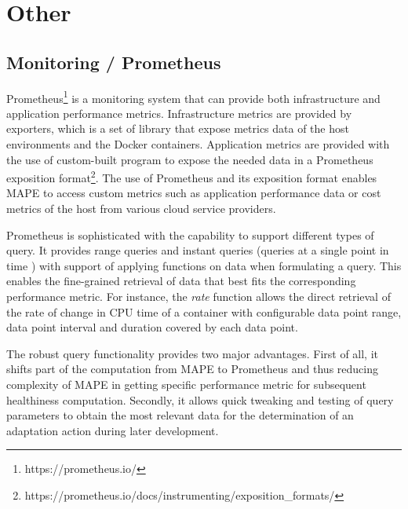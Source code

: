 \documentclass{seal_thesis}
\begin{document}
\section{Other}
\subsection{Monitoring / Prometheus}

Prometheus\footnote{https://prometheus.io/} is a monitoring system that can provide both infrastructure and application performance metrics.
Infrastructure metrics are provided by exporters, which is a set of library that expose metrics data of the host environments and the Docker containers.
Application metrics are provided with the use of custom-built program to expose the needed data in a Prometheus exposition format\footnote{https://prometheus.io/docs/instrumenting/exposition\_formats/}.
The use of Prometheus and its exposition format enables MAPE to access custom metrics such as application performance data or cost metrics of the host from various cloud service providers.

Prometheus is sophisticated with the capability to support different types of query.
It provides range queries and instant queries (queries at a single point in time \cite{prometheus_api}) with support of applying functions on data when formulating a query.
This enables the fine-grained retrieval of data that best fits the corresponding performance metric.
For instance, the \textit{rate} function allows the direct retrieval of the rate of change in CPU time of a container with configurable data point range, data point interval and duration covered by each data point.

The robust query functionality provides two major advantages.
First of all, it shifts part of the computation from MAPE to Prometheus and thus reducing complexity of MAPE in getting specific performance metric for subsequent healthiness computation.
Secondly, it allows quick tweaking and testing of query parameters to obtain the most relevant data for the determination of an adaptation action during later development.
\end{document}
